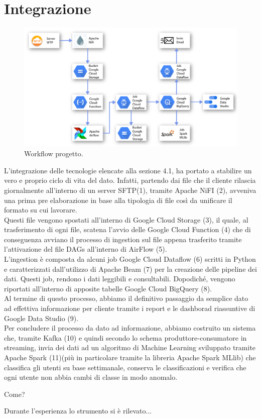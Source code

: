 \section{Integrazione}
\begin{figure}[h!]
	\centering
	\includegraphics[scale=0.7]{figures/Schema_complessivo}
	\caption[Workflow progetto	.]{Workflow progetto.
		\label{fig:logoGCP}}
\end{figure}	
L'integrazione delle tecnologie elencate alla sezione 4.1, ha portato a stabilire un vero e proprio ciclo di vita del dato. Infatti, partendo dai file che il cliente rilascia giornalmente all'interno di un \gls{server SFTP}(1), tramite Apache NiFI (2), avveniva una prima pre elaborazione in base alla tipologia di file così da unificare il formato su cui lavorare.
\\
Questi file vengono spostati all'interno di Google Cloud Storage (3), il quale, al trasferimento di ogni file, scatena l'avvio delle Google Cloud Function (4) che di conseguenza avviano il processo di ingestion sul file appena trasferito tramite l'attivazione del file DAGs all'interno di AirFlow (5).
\\
L'ingestion è composta da alcuni job Google Cloud Dataflow (6) scritti in \gls{Python} e caratterizzati dall'utilizzo di Apache Beam (7) per la creazione delle pipeline dei dati.
Questi job, rendono i dati leggibili e consultabili. Dopodiché, vengono riportati all'interno di apposite tabelle Google Cloud BigQuery (8).
\\
Al termine di questo processo, abbiamo il definitivo passaggio da semplice dato ad effettiva informazione per cliente tramite i report e le dashborad riassuntive di Google Data Studio (9).
\\
Per concludere il processo da dato ad informazione, abbiamo costruito un sistema che, tramite Kafka (10) e quindi secondo lo schema produttore-consumatore in streaming, invia dei dati ad un algoritmo di Machine Learning sviluppato tramite Apache Spark (11)(più in particolare tramite la libreria Apache Spark MLlib) che classifica gli utenti su base settimanale, conserva le classificazioni e verifica che ogni utente non abbia cambi di classe in modo anomalo.

Come?

Durante l'esperienza lo strumento si è rilevato...